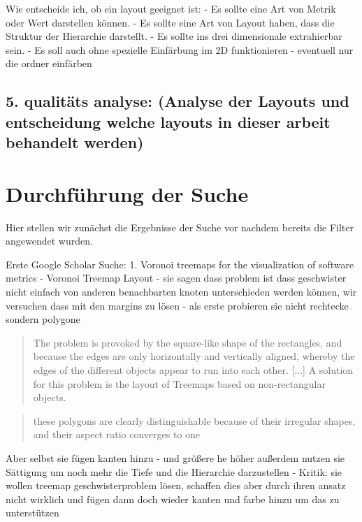 Wie entscheide ich, ob ein layout geeignet ist:
- Es sollte eine Art von Metrik oder Wert darstellen können.
- Es sollte eine Art von Layout haben, dass die Struktur der Hierarchie darstellt.
- Es sollte ins drei dimensionale extrahierbar sein.
- Es soll auch ohne spezielle Einfärbung im 2D funktionieren - eventuell nur die ordner einfärben

\subsection*{5. qualitäts analyse: (Analyse der Layouts und entscheidung welche layouts in dieser arbeit behandelt werden)} \label{sec:QualitaetsAnalyse}

\section{Durchführung der Suche}
Hier stellen wir zunächst die Ergebnisse der Suche vor nachdem bereits die Filter angewendet wurden.

Erste Google Scholar Suche:
1. Voronoi treemaps for the visualization of software metrics \cite{voronoiTree}
- Voronoi Treemap Layout
- sie sagen dass problem ist dass geschwister nicht einfach von anderen benachbarten knoten unterschieden werden können, wir versuchen dass mit den margins zu lösen
- als erste probieren sie nicht rechtecke sondern polygone
\begin{quote}
    The problem is provoked by the square-like shape of the rectangles, and because the edges are only horizontally and vertically aligned, whereby the edges of the different objects appear to run into each other. [...] A solution for this problem is the layout of Treemaps based on non-rectangular objects.\cite[3]{voronoiTree}
\end{quote}
\begin{quote}
    these polygons are clearly distinguishable because of their irregular shapes, and their aspect ratio converges to one \cite[6]{voronoiTree}
\end{quote}
Aber selbst sie fügen kanten hinzu - und größere he höher
außerdem nutzen sie Sättigung um noch mehr die Tiefe und die Hierarchie darzustellen
- Kritik: sie wollen treemap geschwisterproblem lösen, schaffen dies aber durch ihren ansatz nicht wirklich und fügen dann doch wieder kanten und farbe hinzu um das zu unterstützen

